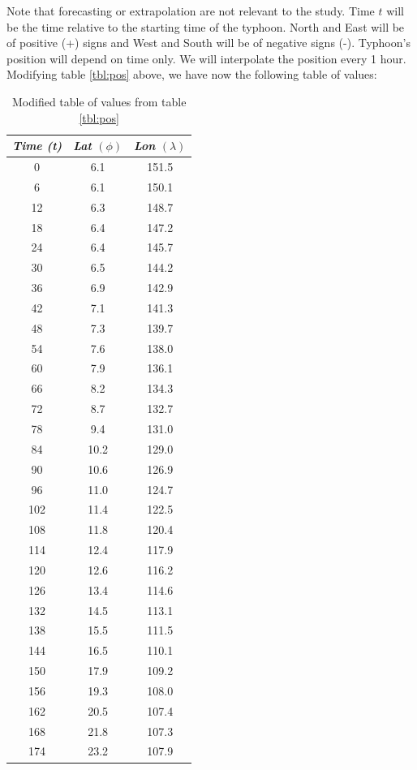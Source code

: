 \documentclass[a4paper, 11pt]{article}
\begin{document}
Note that forecasting or extrapolation are not relevant to the study. Time $t$ will be the time relative to the starting time of the typhoon. North and East will be of positive (+) signs and West and South will be of negative signs (-). Typhoon's position will depend on time only. We will interpolate the position every 1 hour. Modifying table \ref{tbl:pos} above, we have now the following table of values:
\begin{table}[H]
	\centering
	\begin{tabular}{c | c c}
		\textit{Time (t)} & \textit{Lat} $(\phi)$ & \textit{Lon} $(\lambda)$ \\
		\hline
		0 & 6.1 & 151.5 \\
		6 & 6.1 & 150.1 \\
		12 & 6.3 & 148.7 \\
		18 & 6.4 & 147.2 \\
		24 & 6.4 & 145.7 \\
		30 & 6.5 & 144.2 \\
		36 & 6.9 & 142.9 \\
		42 & 7.1 & 141.3 \\
		48 & 7.3 & 139.7 \\
		54 & 7.6 & 138.0 \\
		60 & 7.9 & 136.1 \\
		66 & 8.2 & 134.3 \\
		72 & 8.7 & 132.7 \\
		78 & 9.4 & 131.0 \\
		84 & 10.2 & 129.0 \\
		90 & 10.6 & 126.9 \\
		96 & 11.0 & 124.7 \\
		102 & 11.4 & 122.5 \\
		108 & 11.8 & 120.4 \\
		114 & 12.4 & 117.9 \\
		120 & 12.6 & 116.2 \\
		126 & 13.4 & 114.6 \\
		132 & 14.5 & 113.1 \\
		138 & 15.5 & 111.5 \\
		144 & 16.5 & 110.1 \\
		150 & 17.9 & 109.2 \\
		156 & 19.3 & 108.0 \\
		162 & 20.5 & 107.4 \\
		168 & 21.8 & 107.3 \\
		174 & 23.2 & 107.9 \\
	\end{tabular}
	\caption{Modified table of values from table \ref{tbl:pos}}
	\label{tbl:table}
\end{table}
\end{document}
